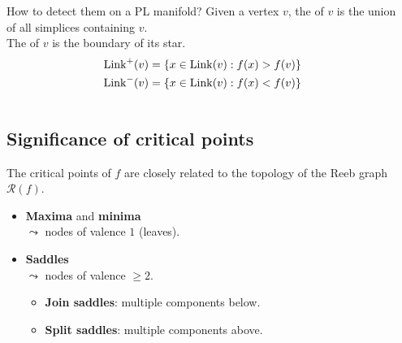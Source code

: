 \begin{frame*}
\begin{columns}[T,onlytextwidth]
\begin{column}{.65\textwidth}
\begin{block}{How to detect them on a PL manifold?}
Given a vertex $v$, the  of $v$ is the union of all simplices containing $v$.\\
The  of $v$ is the boundary of its star.
\begin{align*}
\operatorname{Link}^+(v)&=\left\{x\in\operatorname{Link}(v):f(x)>f(v)\right\}\\
\operatorname{Link}^-(v)&=\left\{x\in\operatorname{Link}(v):f(x)<f(v)\right\}\\
\end{align*}
\end{block}
\end{column}
\begin{column}{.35\textwidth}
\end{column}
\end{columns}
\end{frame*}

\subsection*{Significance of critical points}
\begin{frame*}
The critical points of $f$ are closely related to the topology of the Reeb graph $\mathcal{R}(f)$.
\begin{itemize}
\item \textbf{Maxima} and \textbf{minima}\\
$\leadsto$ nodes of valence $1$ (leaves).
\item \textbf{Saddles}\\
$\leadsto$ nodes of valence $\ge 2$.\\
\begin{itemize}
\item \textbf{Join saddles}: multiple components below.
\item \textbf{Split saddles}: multiple components above.
\end{itemize}
\end{itemize}
\end{frame*}